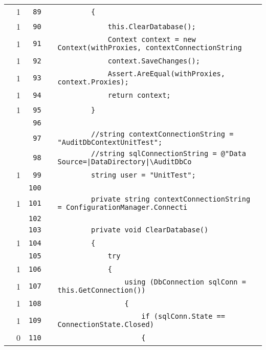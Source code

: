 \documentclass[a4paper,10pt]{article}
\begin{document}
\begin{longtable}[l]{lrrll}
\cellcolor{green} & 1 & \verb~89~ & & \verb~        {~\\
\cellcolor{green} & 1 & \verb~90~ & & \verb~            this.ClearDatabase();~\\
\cellcolor{green} & 1 & \verb~91~ & & \verb~            Context context = new Context(withProxies, contextConnectionString~\\
\cellcolor{green} & 1 & \verb~92~ & & \verb~            context.SaveChanges();~\\
\cellcolor{green} & 1 & \verb~93~ & & \verb~            Assert.AreEqual(withProxies, context.Proxies);~\\
\cellcolor{green} & 1 & \verb~94~ & & \verb~            return context;~\\
\cellcolor{green} & 1 & \verb~95~ & & \verb~        }~\\
\cellcolor{gray} &  & \verb~96~ & & \verb~~\\
\cellcolor{gray} &  & \verb~97~ & & \verb~        //string contextConnectionString = "AuditDbContextUnitTest";~\\
\cellcolor{gray} &  & \verb~98~ & & \verb~        //string sqlConnectionString = @"Data Source=|DataDirectory|\AuditDbCo~\\
\cellcolor{green} & 1 & \verb~99~ & & \verb~        string user = "UnitTest";~\\
\cellcolor{gray} &  & \verb~100~ & & \verb~~\\
\cellcolor{green} & 1 & \verb~101~ & & \verb~        private string contextConnectionString = ConfigurationManager.Connecti~\\
\cellcolor{gray} &  & \verb~102~ & & \verb~~\\
\cellcolor{gray} &  & \verb~103~ & & \verb~        private void ClearDatabase()~\\
\cellcolor{green} & 1 & \verb~104~ & & \verb~        {~\\
\cellcolor{gray} &  & \verb~105~ & & \verb~            try~\\
\cellcolor{green} & 1 & \verb~106~ & & \verb~            {~\\
\cellcolor{green} & 1 & \verb~107~ & & \verb~                using (DbConnection sqlConn = this.GetConnection())~\\
\cellcolor{green} & 1 & \verb~108~ & & \verb~                {~\\
\cellcolor{green} & 1 & \verb~109~ & & \verb~                    if (sqlConn.State == ConnectionState.Closed)~\\
\cellcolor{red} & 0 & \verb~110~ & & \verb~                    {~\\

\end{longtable}
\end{document}
